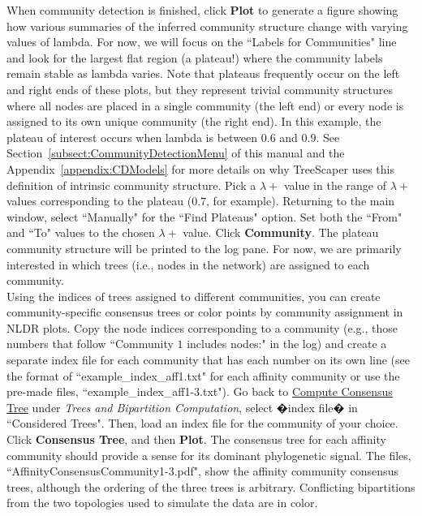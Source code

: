 \documentclass[11pt]{article}
\begin{document}
When community detection is finished, click {\bf Plot} to generate a figure showing how
various summaries of the inferred community structure change with varying values of 
lambda. For now, we will focus on the ``Labels for Communities" line and look for the largest
flat region (a plateau!) where the community labels remain stable as lambda varies. Note that
plateaus frequently occur on the left and right ends of these plots, but they represent trivial
community structures where all nodes are placed in a single community (the left end) or
every node is assigned to its own unique community (the right end). In this example, the
plateau of interest occurs when lambda is between $0.6$ and $0.9$. See Section~\ref{subsect:CommunityDetectionMenu} of this manual
and the Appendix~\ref{appendix:CDModels} for more details on why TreeScaper uses this definition of intrinsic community structure. Pick a $\lambda+$ value in the range of $\lambda+$ values corresponding to the plateau ($0.7$, for example). Returning to the main window, select ``Manually" for the ``Find Plateaus" option. Set both the ``From" and ``To" values to the chosen $\lambda+$ value. Click {\bf Community}. The plateau community structure will be printed to the log pane. For now, we are primarily interested in which trees (i.e., nodes in the network) are assigned to each community. \\


Using the indices of trees assigned to different communities, you can create
community-specific consensus trees or color points by community assignment in NLDR
plots. Copy the node indices corresponding to a community (e.g., those numbers that follow
``Community $1$ includes nodes:" in the log) and create a separate index file for each
community that has each number on its own line (see the format of ``example\_index\_aff1.txt"
for each affinity community or use the pre-made files, ``example\_index\_aff1-3.txt"). Go back
to \ul{Compute Consensus Tree} under {\it Trees and Bipartition Computation}, select �index file� in
``Considered Trees". Then, load an index file for the community of your choice. Click
{\bf Consensus Tree}, and then {\bf Plot}. The consensus tree for each affinity community should
provide a sense for its dominant phylogenetic signal. The files,
``AffinityConsensusCommunity1-3.pdf", show the affinity community consensus trees,
although the ordering of the three trees is arbitrary. Conflicting bipartitions from the two
topologies used to simulate the data are in color. \\
\end{document}
